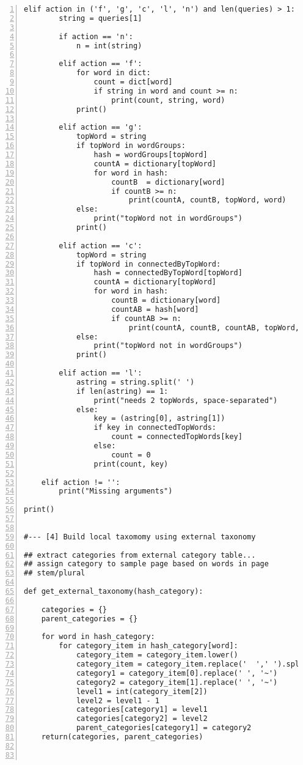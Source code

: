 \documentclass[oneside,10pt]{book}
\begin{document}
\begin{lstlisting}[numbers=left]
    elif action in ('f', 'g', 'c', 'l', 'n') and len(queries) > 1:
        string = queries[1]  

        if action == 'n':
            n = int(string)

        elif action == 'f':
            for word in dict:
                count = dict[word]
                if string in word and count >= n:
                    print(count, string, word)
            print()

        elif action == 'g':
            topWord = string
            if topWord in wordGroups:
                hash = wordGroups[topWord]
                countA = dictionary[topWord]
                for word in hash:
                    countB  = dictionary[word]
                    if countB >= n:
                        print(countA, countB, topWord, word) 
            else:
                print("topWord not in wordGroups")
            print()

        elif action == 'c':
            topWord = string
            if topWord in connectedByTopWord:
                hash = connectedByTopWord[topWord]
                countA = dictionary[topWord]
                for word in hash:
                    countB = dictionary[word]
                    countAB = hash[word]
                    if countAB >= n:
                        print(countA, countB, countAB, topWord, word) 
            else:
                print("topWord not in wordGroups")
            print()

        elif action == 'l':
            astring = string.split(' ')
            if len(astring) == 1:
                print("needs 2 topWords, space-separated")
            else: 
                key = (astring[0], astring[1])
                if key in connectedTopWords:
                    count = connectedTopWords[key]
                else:
                    count = 0
                print(count, key) 

    elif action != '':
        print("Missing arguments")

print()


#--- [4] Build local taxomomy using external taxonomy

## extract categories from external category table... 
## assign category to sample page based on words in page
## stem/plural 

def get_external_taxonomy(hash_category):

    categories = {}
    parent_categories = {}

    for word in hash_category:
        for category_item in hash_category[word]:
            category_item = category_item.lower()
            category_item = category_item.replace('  ',' ').split(' | ')
            category1 = category_item[0].replace(' ', '~')
            category2 = category_item[1].replace(' ', '~')
            level1 = int(category_item[2])
            level2 = level1 - 1
            categories[category1] = level1
            categories[category2] = level2
            parent_categories[category1] = category2
    return(categories, parent_categories)



\end{lstlisting}
\end{document}
